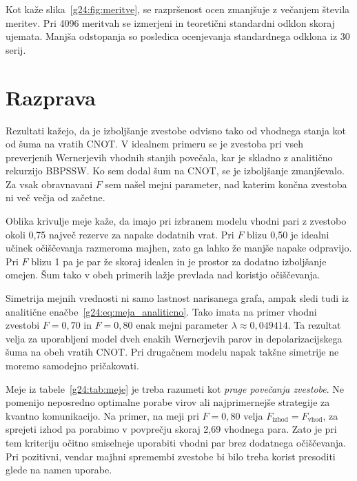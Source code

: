 Kot kaže slika~\ref{g24:fig:meritve}, se razpršenost ocen zmanjšuje z večanjem števila meritev. Pri 4096 meritvah se izmerjeni in teoretični standardni odklon skoraj ujemata. Manjša odstopanja so posledica ocenjevanja standardnega odklona iz 30 serij.

\section{Razprava}
\label{g24:sec:razprava}

Rezultati kažejo, da je izboljšanje zvestobe odvisno tako od vhodnega stanja kot od šuma na vratih CNOT. V idealnem primeru se je zvestoba pri vseh preverjenih Wernerjevih vhodnih stanjih povečala, kar je skladno z analitično rekurzijo BBPSSW. Ko sem dodal šum na CNOT, se je izboljšanje zmanjševalo. Za vsak obravnavani $F$ sem našel mejni parameter, nad katerim končna zvestoba ni več večja od začetne.

Oblika krivulje meje kaže, da imajo pri izbranem modelu vhodni pari z zvestobo okoli 0,75 največ rezerve za napake dodatnih vrat. Pri $F$ blizu 0,50 je idealni učinek očiščevanja razmeroma majhen, zato ga lahko že manjše napake odpravijo. Pri $F$ blizu 1 pa je par že skoraj idealen in je prostor za dodatno izboljšanje omejen. Šum tako v obeh primerih lažje prevlada nad koristjo očiščevanja.

Simetrija mejnih vrednosti ni samo lastnost narisanega grafa, ampak sledi tudi iz analitične enačbe~\eqref{g24:eq:meja_analiticno}. Tako imata na primer vhodni zvestobi $F=0{,}70$ in $F=0{,}80$ enak mejni parameter $\lambda\approx0{,}049414$. Ta rezultat velja za uporabljeni model dveh enakih Wernerjevih parov in depolarizacijskega šuma na obeh vratih CNOT. Pri drugačnem modelu napak takšne simetrije ne moremo samodejno pričakovati.

Meje iz tabele~\ref{g24:tab:meje} je treba razumeti kot \emph{prage povečanja zvestobe}. Ne pomenijo neposredno optimalne porabe virov ali najprimernejše strategije za kvantno komunikacijo. Na primer, na meji pri $F=0{,}80$ velja $F_{\mathrm{izhod}}=F_{\mathrm{vhod}}$, za sprejeti izhod pa porabimo v povprečju skoraj 2,69 vhodnega para. Zato je pri tem kriteriju očitno smiselneje uporabiti vhodni par brez dodatnega očiščevanja. Pri pozitivni, vendar majhni spremembi zvestobe bi bilo treba korist presoditi glede na namen uporabe.

